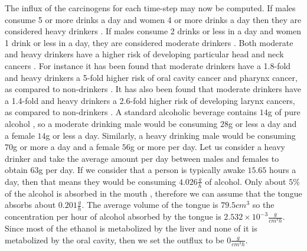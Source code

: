 \documentclass[\main/thesis.tex]{subfiles}
\begin{document}
The influx of the carcinogens for each time-step may now be computed. If males consume 5 or more drinks a day and women 4 or more drinks a day then they are considered heavy drinkers \cite{niaaa.nih.gov_2021_2}. If males consume 2 drinks or less in a day and women 1 drink or less in a day, they are considered moderate drinkers \cite{niaaa.nih.gov_2021_2}. Both moderate and heavy drinkers have a higher risk of developing particular head and neck cancers \cite{Bagnardi, LoConte}. For instance it has been found that moderate drinkers have a 1.8-fold  and heavy drinkers a 5-fold higher risk of oral cavity cancer and pharynx cancer, as compared to non-drinkers \cite{Bagnardi, LoConte}. It has also been found that moderate drinkers have a 1.4-fold and heavy drinkers a 2.6-fold higher risk of developing larynx cancers, as compared to non-drinkers \cite{Bagnardi, LoConte}. A standard alcoholic beverage contains $14$g of pure alcohol \cite{niaaa.nih.gov_2021_1}, so a moderate drinking male would be consuming $28$g or less a day and a female $14$g or less a day. Similarly, a heavy drinking male would be consuming $70$g or more a day and a female $56$g or more per day. Let us consider a heavy drinker and take the average amount per day between males and females to obtain $63$g per day. If we consider that a person is typically awake $15.65$ hours a day, then that means they would be consuming $4.026 \frac{g}{h}$ of alcohol. Only about $5\%$ of the alcohol is absorbed in the mouth \cite{proserve.aglc.ca}, therefore we can assume that the tongue absorbs about $0.201 \frac{g}{h}$. The average volume of the tongue is $79.5 cm^3$ \cite{Liégeois} so the concentration per hour of alcohol absorbed by the tongue is $2.532{\times}10^{-3} \frac{g}{cm^3 h}$. Since most of the ethanol is metabolized by the liver and none of it is metabolized by the oral cavity, then we set the outflux to be $0 \frac{g}{cm^3 h}$. 
\end{document}
